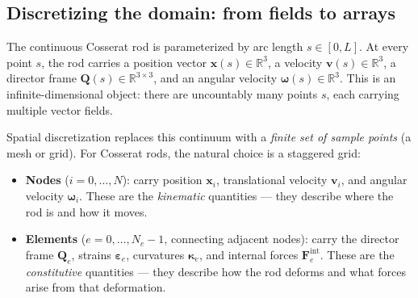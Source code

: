 \documentclass[11pt]{article}
\newcommand{\vect}[1]{\mathbf{#1}}
\newcommand{\mat}[1]{\mathbf{#1}}
\newcommand{\Real}{\mathbb{R}}
\begin{document}
\subsection{Discretizing the domain: from fields to arrays}

The continuous Cosserat rod is parameterized by arc length $s \in [0, L]$.
At every point $s$, the rod carries a position vector $\vect{x}(s) \in \Real^3$, a velocity $\vect{v}(s) \in \Real^3$, a director frame $\mat{Q}(s) \in \Real^{3 \times 3}$, and an angular velocity $\bm{\omega}(s) \in \Real^3$.
This is an infinite-dimensional object: there are uncountably many points $s$, each carrying multiple vector fields.

Spatial discretization replaces this continuum with a \emph{finite set of sample points} (a mesh or grid).
For Cosserat rods, the natural choice is a staggered grid:

\begin{center}
\end{center}

\begin{itemize}
  \item \textbf{Nodes} ($i = 0, \dots, N$): carry position $\vect{x}_i$, translational velocity $\vect{v}_i$, and angular velocity $\bm{\omega}_i$.
    These are the \emph{kinematic} quantities --- they describe where the rod is and how it moves.
  \item \textbf{Elements} ($e = 0, \dots, N_e - 1$, connecting adjacent nodes): carry the director frame $\mat{Q}_e$, strains $\bm{\varepsilon}_e$, curvatures $\bm{\kappa}_e$, and internal forces $\vect{F}_e^{\text{int}}$.
    These are the \emph{constitutive} quantities --- they describe how the rod deforms and what forces arise from that deformation.
\end{itemize}
\end{document}
